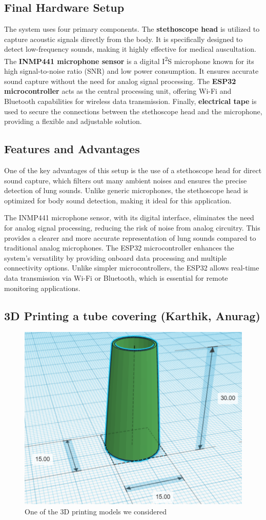 \documentclass[conference]{IEEEtran}
\begin{document}
\subsection{Final Hardware Setup}

The system uses four primary components. The \textbf{stethoscope head} is utilized to capture acoustic signals directly from the body. It is specifically designed to detect low-frequency sounds, making it highly effective for medical auscultation. The \textbf{INMP441 microphone sensor} is a digital I\textsuperscript{2}S microphone known for its high signal-to-noise ratio (SNR) and low power consumption. It ensures accurate sound capture without the need for analog signal processing. The \textbf{ESP32 microcontroller} acts as the central processing unit, offering Wi-Fi and Bluetooth capabilities for wireless data transmission. Finally, \textbf{electrical tape} is used to secure the connections between the stethoscope head and the microphone, providing a flexible and adjustable solution.

\subsection{Features and Advantages}

One of the key advantages of this setup is the use of a stethoscope head for direct sound capture, which filters out many ambient noises and ensures the precise detection of lung sounds. Unlike generic microphones, the stethoscope head is optimized for body sound detection, making it ideal for this application.
         
The INMP441 microphone sensor, with its digital interface, eliminates the need for analog signal processing, reducing the risk of noise from analog circuitry. This provides a clearer and more accurate representation of lung sounds compared to traditional analog microphones. The ESP32 microcontroller enhances the system's versatility by providing onboard data processing and multiple connectivity options. Unlike simpler microcontrollers, the ESP32 allows real-time data transmission via Wi-Fi or Bluetooth, which is essential for remote monitoring applications. 

\subsection{3D Printing a tube covering (Karthik, Anurag)}
      
\begin{figure}
    \centering
    \includegraphics[width=0.5\linewidth]{Images/3dprint1.png}
    \caption{One of the 3D printing models we considered}
    \label{fig:enter-label}
\end{figure}
\end{document}
